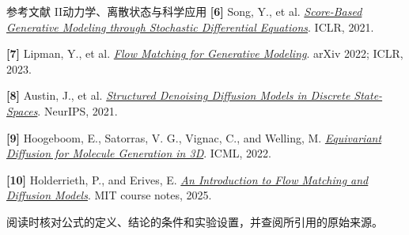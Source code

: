 \documentclass[UTF8,aspectratio=169,11pt,fontset=none]{ctexbeamer}
\newcommand{\takeaway}[1]{\begin{tcolorbox}[enhanced,colback=paper,colframe=paper,boxrule=0pt,arc=1.5mm,left=2.5mm,right=2.5mm,top=1.7mm,bottom=1.7mm,before skip=2mm,after skip=1mm]\small #1\end{tcolorbox}}
\begin{document}
\begin{frame}{参考文献 II\quad 动力学、离散状态与科学应用}
\fontsize{8.6}{11.5}\selectfont
\textbf{[6]} Song, Y., et al. \href{https://arxiv.org/abs/2011.13456}{\textit{Score-Based Generative Modeling through Stochastic Differential Equations}}. ICLR, 2021.\par
\vspace{0.11cm}
\textbf{[7]} Lipman, Y., et al. \href{https://arxiv.org/abs/2210.02747}{\textit{Flow Matching for Generative Modeling}}. arXiv 2022; ICLR, 2023.\par
\vspace{0.11cm}
\textbf{[8]} Austin, J., et al. \href{https://arxiv.org/abs/2107.03006}{\textit{Structured Denoising Diffusion Models in Discrete State-Spaces}}. NeurIPS, 2021.\par
\vspace{0.11cm}
\textbf{[9]} Hoogeboom, E., Satorras, V. G., Vignac, C., and Welling, M. \href{https://arxiv.org/abs/2203.17003}{\textit{Equivariant Diffusion for Molecule Generation in 3D}}. ICML, 2022.\par
\vspace{0.11cm}
\textbf{[10]} Holderrieth, P., and Erives, E. \href{https://arxiv.org/abs/2506.02070}{\textit{An Introduction to Flow Matching and Diffusion Models}}. MIT course notes, 2025.\par
\vspace{0.25cm}
\takeaway{阅读时核对公式的定义、结论的条件和实验设置，并查阅所引用的原始来源。}
\end{frame}
\end{document}
